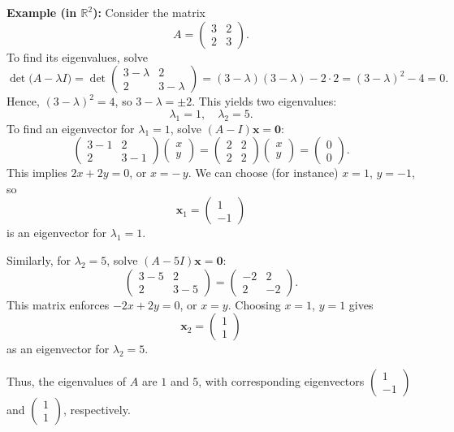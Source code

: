 \noindent
\textbf{Example (in $\mathbb{R}^2$):} 
Consider the matrix 
\[
  A = \begin{pmatrix} 3 & 2 \\ 2 & 3 \end{pmatrix}.
\]
To find its eigenvalues, solve
\[
  \det\!\bigl(A - \lambda I\bigr) 
  = \det\!\begin{pmatrix} 3-\lambda & 2 \\ 2 & 3-\lambda \end{pmatrix} 
  = (3-\lambda)(3-\lambda) - 2\cdot 2 
  = (3-\lambda)^2 - 4 
  = 0.
\]
Hence, $(3-\lambda)^2 = 4$, so $3 - \lambda = \pm 2$. This yields two eigenvalues:
\[
  \lambda_1 = 1, \quad \lambda_2 = 5.
\]
To find an eigenvector for $\lambda_1 = 1$, solve $(A - I)\mathbf{x} = \mathbf{0}$:
\[
  \begin{pmatrix} 3-1 & 2 \\ 2 & 3-1 \end{pmatrix}
  \begin{pmatrix} x \\ y \end{pmatrix}
  = \begin{pmatrix} 2 & 2 \\ 2 & 2 \end{pmatrix}
    \begin{pmatrix} x \\ y \end{pmatrix}
  = \begin{pmatrix} 0 \\ 0 \end{pmatrix}.
\]
This implies $2x + 2y = 0$, or $x = -\,y$. We can choose (for instance) $x=1$, $y=-1$, 
so 
\[
  \mathbf{x}_1 = \begin{pmatrix} 1 \\ -1 \end{pmatrix}
\]
is an eigenvector for $\lambda_1 = 1$. 

Similarly, for $\lambda_2 = 5$, solve $(A - 5I)\mathbf{x} = \mathbf{0}$:
\[
  \begin{pmatrix} 3-5 & 2 \\ 2 & 3-5 \end{pmatrix}
  = \begin{pmatrix} -2 & 2 \\ 2 & -2 \end{pmatrix}.
\]
This matrix enforces $-2x + 2y = 0$, or $x = y$. Choosing $x=1$, $y=1$ gives 
\[
  \mathbf{x}_2 = \begin{pmatrix} 1 \\ 1 \end{pmatrix}
\]
as an eigenvector for $\lambda_2 = 5$.

Thus, the eigenvalues of $A$ are $1$ and $5$, with corresponding eigenvectors 
$\begin{pmatrix}1\\-1\end{pmatrix}$ and $\begin{pmatrix}1\\1\end{pmatrix}$, respectively.


